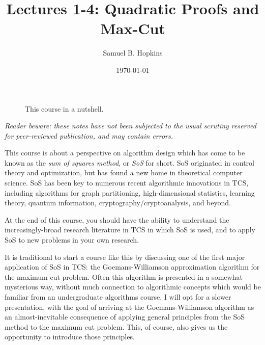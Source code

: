 \documentclass[11pt]{article}
\title{Lectures 1-4: Quadratic Proofs  and Max-Cut}
\author{Samuel B. Hopkins}
\date{\today}
\begin{document}
\maketitle

\begin{figure}[h]
  \begin{center}
\end{center}
\caption{This course in a nutshell.}
\end{figure}

\noindent \emph{Reader beware: these notes have not been subjected to the usual scrutiny reserved for peer-reviewed publication, and may contain errors.}

\vspace{1em}

This course is about a perspective on algorithm design which has come to be known as the \emph{sum of squares method}, or \emph{SoS} for short.
SoS originated in control theory and optimization, but has found a new home in theoretical computer science.
SoS has been key to numerous recent algorithmic innovations in TCS, including algorithms for graph partitioning, high-dimensional statistics, learning theory, quantum information, cryptography/cryptoanalysis, and beyond.

At the end of this course, you should have the ability to understand the increasingly-broad research literature in TCS in which SoS is used, and to apply SoS to new problems in your own research.

It is traditional to start a course like this by discussing one of the first major application of SoS in TCS: the Goemans-Williamson approximation algorithm for the maximum cut problem.
Often this algorithm is presented in a somewhat mysterious way, without much connection to algorithmic concepts which would be familiar from an undergraduate algorithms course.
I will opt for a slower presentation, with the goal of arriving at the Goemans-Williamson algorithm as an almost-inevitable consequence of applying general principles from the SoS method to the maximum cut problem.
This, of course, also gives us the opportunity to introduce those principles.
\end{document}

